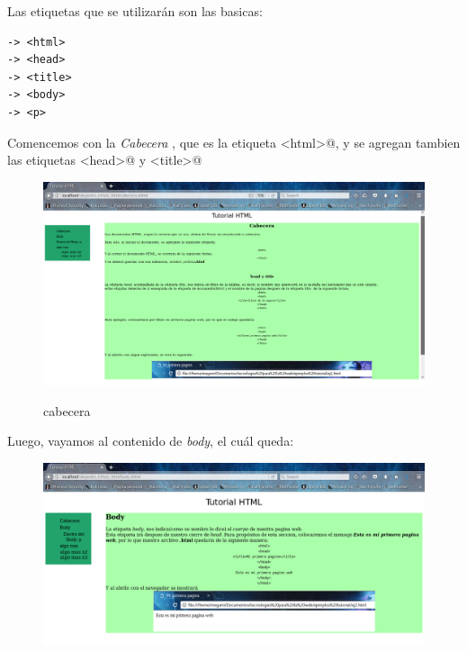 \documentclass[12pt,letterpaper, spanish]{article}
\begin{document}
\begin{flushleft}
\begin{center}
\begin{figure}[h!]
\end{figure}
\end{center}
\vspace{-1cm}
Las etiquetas que se utilizar\'an son las basicas:\\
\begin{verbatim}
-> <html>
-> <head>
-> <title>
-> <body>
-> <p>
\end{verbatim}
Comencemos con la {\em Cabecera }, que es la etiqueta \verb@<html>@, y se agregan tambien las etiquetas \verb@<head>@ y \verb@<title>@
\vspace{-5mm}
\newpage
\begin{center}
\begin{figure}[h!]
\includegraphics[scale=0.3]{./imgs/cabecera.png}
\vspace{-10mm}
{\em{\caption {cabecera}}}\label{figura 9}
\end{figure}
\end{center}
\vspace{-1cm}
Luego, vayamos al contenido de {\em body}, el cu\'al queda:
\vspace{-5mm}
\begin{center}
\begin{figure}[h!]
\includegraphics[scale=0.3]{./imgs/body.png}

\end{figure}
\end{center}
\end{flushleft}
\end{document}

